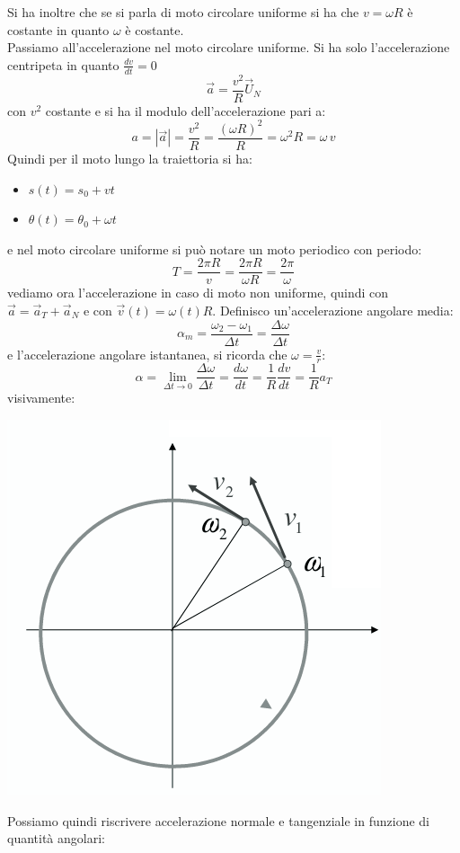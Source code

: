 \documentclass[a4paper,12pt, oneside]{book}
\begin{document}
Si ha inoltre che se si parla di moto circolare uniforme si ha che $v=\omega R$ è costante in quanto $\omega$ è costante.\\
Passiamo all'accelerazione nel moto circolare uniforme. Si ha solo l'accelerazione centripeta in quanto $\frac{dv}{dt}=0$
$$\vec{a}=\frac{v^2}{R}\vec{U}_N$$
con $v^2$ costante e si ha il modulo dell'accelerazione pari a:
$$a=|\vec{a}|=\frac{v^2}{R}=\frac{(\omega R)^2}{R}=\omega^2 R=\omega \, v$$
Quindi per il moto lungo la traiettoria si ha:
\begin{itemize}
	\item $s(t)=s_0+vt$
	\item $\theta(t)=\theta_0+\omega t$
\end{itemize}
e nel moto circolare uniforme si può notare un moto periodico con periodo:
$$T=\frac{2\pi R}{v}=\frac{2\pi R}{\omega R}=\frac{2\pi}{\omega}$$
vediamo ora l'accelerazione in caso di moto non uniforme, quindi con $\vec{a}=\vec{a}_T+\vec{a}_N$ e con $\vec{v}(t)=\omega(t)R$. Definisco un'accelerazione angolare media:
$$\alpha_m=\frac{\omega_2-\omega_1}{\Delta t}=\frac{\Delta\omega}{\Delta t}$$
e l'accelerazione angolare istantanea, si ricorda che $\omega=\frac{v}{r}$:
$$\alpha=\lim_{\Delta t\to 0}\frac{\Delta\omega}{\Delta t}=\frac{d\omega}{dt}=\frac{1}{R}\frac{dv}{dt}=\frac{1}{R}a_T$$
\newpage
visivamente:
\begin{center}
	\includegraphics[scale=0.4]{img/cir4.png}
\end{center}
Possiamo quindi riscrivere accelerazione normale e tangenziale in funzione di quantità angolari:
\end{document}
